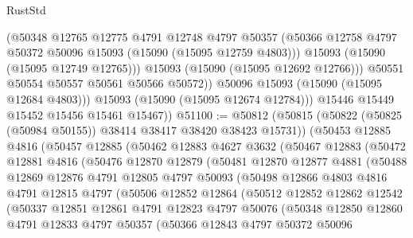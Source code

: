 \begin{lexlean}{RustStd}
\begin{coremodule}
                  (@50348
                    @12765
                    @12775
                    @4791
                    @12748
                    @4797
                    @50357
                    (@50366 @12758 @4797 @50372 @50096 @15093 (@15090 (@15095 @12759 @4803)))
                    @15093
                    (@15090 (@15095 @12749 @12765)))
                  @15093
                  (@15090 (@15095 @12692 @12766)))
                @50551
                @50554
                @50557
                @50561
                @50566
                @50572))
            @50096
            @15093
            (@15090 (@15095 @12684 @4803)))
          @15093
          (@15090 (@15095 @12674 @12784)))
        @15446
        @15449
        @15452
        @15456
        @15461
        @15467))
@51100 := @50812
    (@50815 (@50822 (@50825 (@50984 @50155)) @38414 @38417 @38420 @38423 @15731))
    (@50453
      @12885
      @4816
      (@50457
        @12885
        (@50462
          @12883
          @4627
          @3632
          (@50467
            @12883
            (@50472
              @12881
              @4816
              (@50476
                @12870
                @12879
                (@50481
                  @12870
                  @12877
                  @4881
                  (@50488
                    @12869
                    @12876
                    @4791
                    @12805
                    @4797
                    @50093
                    (@50498
                      @12866
                      @4803
                      @4816
                      @4791
                      @12815
                      @4797
                      (@50506
                        @12852
                        @12864
                        (@50512
                          @12852
                          @12862
                          @12542
                          (@50337
                            @12851
                            @12861
                            @4791
                            @12823
                            @4797
                            @50076
                            (@50348
                              @12850
                              @12860
                              @4791
                              @12833
                              @4797
                              @50357
                              (@50366
                                @12843
                                @4797
                                @50372
                                @50096

\end{coremodule}
\end{lexlean}
